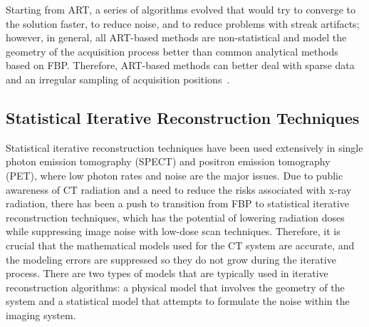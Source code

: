  Starting from ART, a series of algorithms evolved that would try to converge to the solution faster, to reduce noise, and to reduce problems with streak artifacts; however, in general, all ART-based methods are non-statistical and model the geometry of the acquisition process better than common analytical methods based on FBP.  Therefore, ART-based methods can better deal with sparse data and an irregular sampling of acquisition positions~\citep{Beister2012}.


\subsection{Statistical Iterative Reconstruction Techniques}
Statistical iterative reconstruction techniques have been used extensively in single photon emission tomography (SPECT) and positron emission tomography (PET), where low photon rates and noise are the major issues.  Due to public awareness of CT radiation and a need to reduce the risks associated with x-ray radiation, there has been a push to transition from FBP to statistical iterative reconstruction techniques, which has the potential of lowering radiation doses while suppressing image noise with low-dose scan techniques.  Therefore, it is crucial that the mathematical models used for the CT system are accurate, and the modeling errors are suppressed so they do not grow during the iterative process.  There are two types of models that are typically used in iterative reconstruction algorithms: a physical model that involves the geometry of the system and a statistical model that attempts to formulate the noise within the imaging system.


